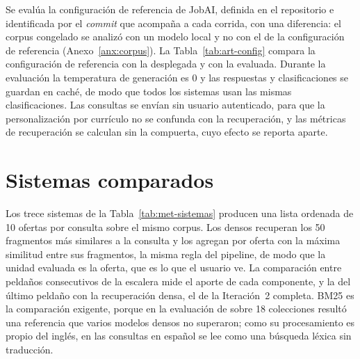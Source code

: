 Se evalúa la configuración de referencia de JobAI, definida en el repositorio e identificada por el \textit{commit} que acompaña a cada corrida, con una diferencia: el corpus congelado se analizó con un modelo local y no con el de la configuración de referencia (Anexo~\ref{anx:corpus}). La Tabla~\ref{tab:art-config} compara la configuración de referencia con la desplegada y con la evaluada. Durante la evaluación la temperatura de generación es 0 y las respuestas y clasificaciones se guardan en caché, de modo que todos los sistemas usan las mismas clasificaciones. Las consultas se envían sin usuario autenticado, para que la personalización por currículo no se confunda con la recuperación, y las métricas de recuperación se calculan sin la compuerta, cuyo efecto se reporta aparte.

\section{Sistemas comparados}
\label{sec:met-sistemas}

Los trece sistemas de la Tabla~\ref{tab:met-sistemas} producen una lista ordenada de 10 ofertas por consulta sobre el mismo corpus. Los densos recuperan los 50 fragmentos más similares a la consulta y los agregan por oferta con la máxima similitud entre sus fragmentos, la misma regla del pipeline, de modo que la unidad evaluada es la oferta, que es lo que el usuario ve. La comparación entre peldaños consecutivos de la escalera mide el aporte de cada componente, y la del último peldaño con la recuperación densa, el de la Iteración~2 completa. BM25 es la comparación exigente, porque en la evaluación de \citet{Thakur2021} sobre 18 colecciones resultó una referencia que varios modelos densos no superaron; como su procesamiento es propio del inglés, en las consultas en español se lee como una búsqueda léxica sin traducción.

